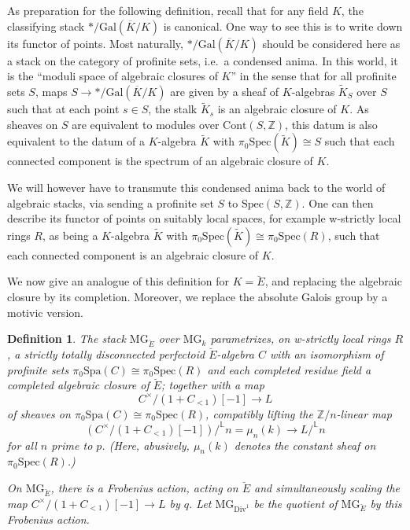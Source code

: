 \documentclass[11pt]{amsart}
\numberwithin{equation}{section}
\numberwithin{theorem}{section}
\newtheorem{definition}[theorem]{Definition}
\theoremstyle{definition}
\newcommand{\Div}{\mathrm{Div}}
\begin{document}
As preparation for the following definition, recall that for any field $K$, the classifying stack $\ast/\mathrm{Gal}(\overline{K}/K)$ is canonical. One way to see this is to write down its functor of points. Most naturally, $\ast/\mathrm{Gal}(\overline{K}/K)$ should be considered here as a stack on the category of profinite sets, i.e.~a condensed anima. In this world, it is the ``moduli space of algebraic closures of $K$'' in the sense that for all profinite sets $S$, maps $S\to \ast/\mathrm{Gal}(\overline{K}/K)$ are given by a sheaf of $K$-algebras $\tilde{K}_S$ over $S$ such that at each point $s\in S$, the stalk $\tilde{K}_s$ is an algebraic closure of $K$. As sheaves on $S$ are equivalent to modules over $\mathrm{Cont}(S,\mathbb Z)$, this datum is also equivalent to the datum of a $K$-algebra $\tilde{K}$ with $\pi_0 \mathrm{Spec}(\tilde{K})\cong S$ such that each connected component is the spectrum of an algebraic closure of $K$.

We will however have to transmute this condensed anima back to the world of algebraic stacks, via sending a profinite set $S$ to $\mathrm{Spec}(S,\mathbb Z)$. One can then describe its functor of points on suitably local spaces, for example w-strictly local rings $R$, as being a $K$-algebra $\tilde{K}$ with $\pi_0 \mathrm{Spec}(\tilde{K})\cong \pi_0 \mathrm{Spec}(R)$, such that each connected component is an algebraic closure of $K$.

We now give an analogue of this definition for $K=\breve{E}$, and replacing the algebraic closure by its completion. Moreover, we replace the absolute Galois group by a motivic version.

\begin{definition} The stack $\mathrm{MG}_{\breve{E}}$ over $\mathrm{MG}_k$ parametrizes, on w-strictly local rings $R$, a strictly totally disconnected perfectoid $\breve{E}$-algebra $C$ with an isomorphism of profinite sets $\pi_0 \mathrm{Spa}(C)\cong \pi_0 \mathrm{Spec}(R)$ and each completed residue field a completed algebraic closure of $\breve{E}$; together with a map
\[
C^\times/(1+C_{<1})[-1]\to L
\]
of sheaves on $\pi_0 \mathrm{Spa}(C)\cong \pi_0\mathrm{Spec}(R)$, compatibly lifting the $\mathbb Z/n$-linear map
\[
(C^\times/(1+C_{<1})[-1])/^{\mathbb L} n = \mu_n(k)\to L/^{\mathbb L} n
\]
for all $n$ prime to $p$. (Here, abusively, $\mu_n(k)$ denotes the constant sheaf on $\pi_0 \mathrm{Spec}(R)$.)

On $\mathrm{MG}_{\breve{E}}$, there is a Frobenius action, acting on $\breve{E}$ and simultaneously scaling the map $C^\times/(1+C_{<1})[-1]\to L$ by $q$. Let $\mathrm{MG}_{\Div^1}$ be the quotient of $\mathrm{MG}_{\breve{E}}$ by this Frobenius action.
\end{definition}
\end{document}

